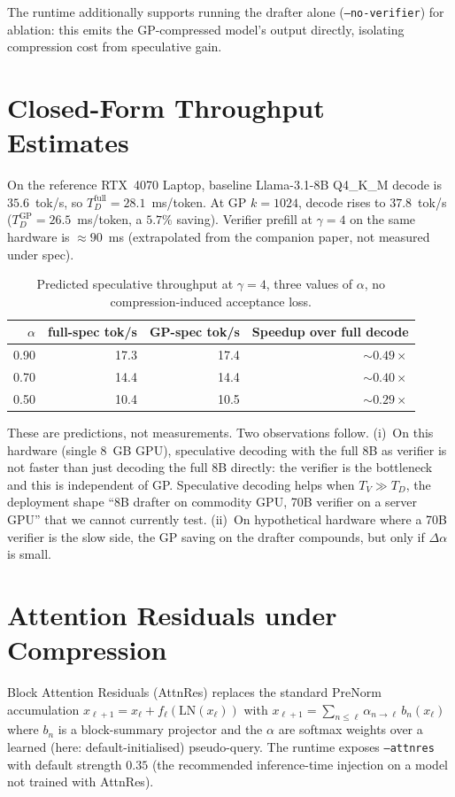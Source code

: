 \documentclass[11pt]{article}
\begin{document}
The runtime additionally supports running the drafter alone
(\texttt{--no-verifier}) for ablation: this emits the GP-compressed
model's output directly, isolating compression cost from speculative
gain.

\section{Closed-Form Throughput Estimates}
\label{sec:closedform}
On the reference RTX~4070 Laptop, baseline Llama-3.1-8B Q4\_K\_M decode
is $35.6$~tok/s, so $T_D^\text{full}{=}28.1$~ms/token.  At GP
$k{=}1024$, decode rises to $37.8$~tok/s
($T_D^\text{GP}{=}26.5$~ms/token, a $5.7\%$ saving).  Verifier prefill
at $\gamma{=}4$ on the same hardware is $\approx 90$~ms (extrapolated
from the companion paper, not measured under spec).

\begin{table}[h]\centering\small
\caption{Predicted speculative throughput at $\gamma{=}4$, three values
of $\alpha$, no compression-induced acceptance loss.}
\begin{tabular}{@{}rrrr@{}}
\toprule
$\alpha$ & full-spec tok/s & GP-spec tok/s & Speedup over full decode \\
\midrule
0.90 & 17.3 & 17.4 & $\sim 0.49\times$ \\
0.70 & 14.4 & 14.4 & $\sim 0.40\times$ \\
0.50 & 10.4 & 10.5 & $\sim 0.29\times$ \\
\bottomrule
\end{tabular}
\end{table}

These are predictions, not measurements.  Two observations follow.
(i)~On this hardware (single 8~GB GPU), speculative decoding with
the full 8B as verifier is not faster than just decoding the full
8B directly: the verifier is the bottleneck and this is independent of
GP.  Speculative decoding helps when $T_V\gg T_D$, the deployment shape
``8B drafter on commodity GPU, 70B verifier on a server GPU'' that we
cannot currently test.  (ii)~On hypothetical hardware where a 70B
verifier is the slow side, the GP saving on the drafter compounds, but
only if $\Delta\alpha$ is small.

\section{Attention Residuals under Compression}
\label{sec:attnres}
Block Attention Residuals (AttnRes) replaces the standard PreNorm
accumulation $x_{\ell+1}=x_\ell+f_\ell(\mathrm{LN}(x_\ell))$ with
\(x_{\ell+1}=\sum_{n\leq\ell}\alpha_{n\to\ell}\,b_n(x_\ell)\) where $b_n$
is a block-summary projector and the $\alpha$ are softmax weights over a
learned (here: default-initialised) pseudo-query.  The runtime exposes
\texttt{--attnres} with default strength $0.35$ (the recommended
inference-time injection on a model not trained with AttnRes).
\end{document}
